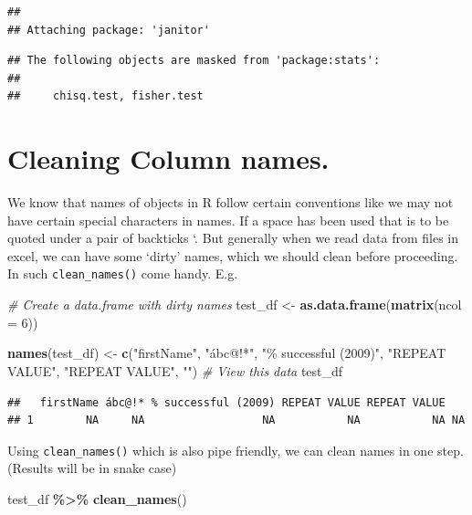 \documentclass[
]{book}
\newenvironment{Shaded}{\begin{snugshade}}{\end{snugshade}}
\newcommand{\AttributeTok}[1]{\textcolor[rgb]{0.13,0.29,0.53}{#1}}
\newcommand{\CommentTok}[1]{\textcolor[rgb]{0.56,0.35,0.01}{\textit{#1}}}
\newcommand{\DecValTok}[1]{\textcolor[rgb]{0.00,0.00,0.81}{#1}}
\newcommand{\FunctionTok}[1]{\textcolor[rgb]{0.13,0.29,0.53}{\textbf{#1}}}
\newcommand{\NormalTok}[1]{#1}
\newcommand{\OtherTok}[1]{\textcolor[rgb]{0.56,0.35,0.01}{#1}}
\newcommand{\SpecialCharTok}[1]{\textcolor[rgb]{0.81,0.36,0.00}{\textbf{#1}}}
\newcommand{\StringTok}[1]{\textcolor[rgb]{0.31,0.60,0.02}{#1}}
\begin{document}
\begin{verbatim}
## 
## Attaching package: 'janitor'
\end{verbatim}

\begin{verbatim}
## The following objects are masked from 'package:stats':
## 
##     chisq.test, fisher.test
\end{verbatim}

\hypertarget{cleaning-column-names.}{%
\section{Cleaning Column names.}\label{cleaning-column-names.}}

We know that names of objects in R follow certain conventions like we may not have certain special characters in names. If a space has been used that is to be quoted under a pair of backticks `. But generally when we read data from files in excel, we can have some `dirty' names, which we should clean before proceeding. In such \texttt{clean\_names()} come handy. E.g.

\begin{Shaded}
\begin{Highlighting}[]
\CommentTok{\# Create a data.frame with dirty names}
\NormalTok{test\_df }\OtherTok{\textless{}{-}} \FunctionTok{as.data.frame}\NormalTok{(}\FunctionTok{matrix}\NormalTok{(}\AttributeTok{ncol =} \DecValTok{6}\NormalTok{))}

\FunctionTok{names}\NormalTok{(test\_df) }\OtherTok{\textless{}{-}} \FunctionTok{c}\NormalTok{(}\StringTok{"firstName"}\NormalTok{, }\StringTok{"ábc@!*"}\NormalTok{, }\StringTok{"\% successful (2009)"}\NormalTok{,}
                    \StringTok{"REPEAT VALUE"}\NormalTok{, }\StringTok{"REPEAT VALUE"}\NormalTok{, }\StringTok{""}\NormalTok{)}
\CommentTok{\# View this data}
\NormalTok{test\_df}
\end{Highlighting}
\end{Shaded}

\begin{verbatim}
##   firstName ábc@!* % successful (2009) REPEAT VALUE REPEAT VALUE   
## 1        NA     NA                  NA           NA           NA NA
\end{verbatim}

Using \texttt{clean\_names()} which is also pipe friendly, we can clean names in one step. (Results will be in snake case)

\begin{Shaded}
\begin{Highlighting}[]
\NormalTok{test\_df }\SpecialCharTok{\%\textgreater{}\%} 
  \FunctionTok{clean\_names}\NormalTok{()}
\end{Highlighting}
\end{Shaded}
\end{document}
